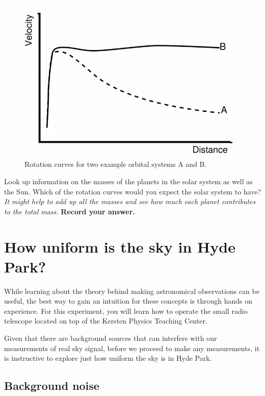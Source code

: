 \begin{figure}
	\centering
	\includegraphics[scale = .3]{srt-background-rotation/galactic_rotation_curve}
	\caption{Rotation curves for two example orbital systems A and B.}\label{sbr:fig:rotations-a-b}
\end{figure}

\begin{steps}
	\item Look up information on the masses of the planets in the solar system as well as the Sun. Which of the rotation curves would you expect the solar system to have? \textit{It might help to add up all the masses and see how much each planet contributes to the total mass.} \textbf{Record your answer.}
\end{steps}

\section{How uniform is the sky in Hyde Park?} %

While learning about the theory behind making astronomical observations can be useful, the best way to gain an intuition for these concepts is through hands on experience. For this experiment, you will learn how to operate the small radio telescope located on top of the Kersten Physics Teaching Center.

Given that there are background sources that can interfere with our
measurements of real sky signal, before we proceed to make any measurements,
it is instructive to explore just how uniform the sky is in Hyde Park.

\subsection{Background noise}

